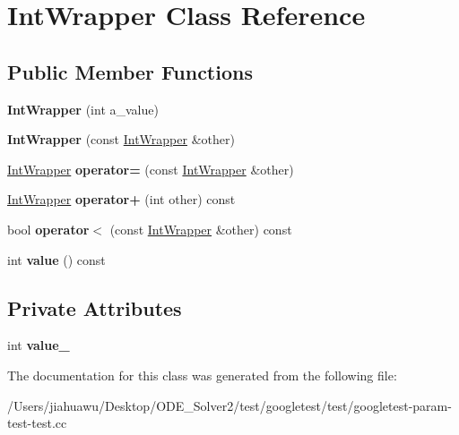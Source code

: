 \hypertarget{class_int_wrapper}{}\section{Int\+Wrapper Class Reference}
\label{class_int_wrapper}
\subsection*{Public Member Functions}
\begin{DoxyCompactItemize}
\item 
\mbox{\label{class_int_wrapper_a1d35e0d0b9c0fc109a8d2a2118ae6010}} 
{\bfseries Int\+Wrapper} (int a\+\_\+value)
\item 
\mbox{\label{class_int_wrapper_af23efe3c8d8bf176948922b41e8f253e}} 
{\bfseries Int\+Wrapper} (const \mbox{\hyperlink{class_int_wrapper}{Int\+Wrapper}} \&other)
\item 
\mbox{\label{class_int_wrapper_a39077b3c0eb1dd8a296a81bfb0a047b3}} 
\mbox{\hyperlink{class_int_wrapper}{Int\+Wrapper}} {\bfseries operator=} (const \mbox{\hyperlink{class_int_wrapper}{Int\+Wrapper}} \&other)
\item 
\mbox{\label{class_int_wrapper_abf97bd11dd2825f3cb9e4d9f48152b56}} 
\mbox{\hyperlink{class_int_wrapper}{Int\+Wrapper}} {\bfseries operator+} (int other) const
\item 
\mbox{\label{class_int_wrapper_a940fd2978cdf7849281f11b32df94163}} 
bool {\bfseries operator$<$} (const \mbox{\hyperlink{class_int_wrapper}{Int\+Wrapper}} \&other) const
\item 
\mbox{\label{class_int_wrapper_a6103e9dc5eb94678985e3c2ac481b508}} 
int {\bfseries value} () const
\end{DoxyCompactItemize}
\subsection*{Private Attributes}
\begin{DoxyCompactItemize}
\item 
\mbox{\label{class_int_wrapper_a9695c22c2bcd5a7bc2775cf6e3a6e33a}} 
int {\bfseries value\+\_\+}
\end{DoxyCompactItemize}


The documentation for this class was generated from the following file\+:\begin{DoxyCompactItemize}
\item 
/\+Users/jiahuawu/\+Desktop/\+O\+D\+E\+\_\+\+Solver2/test/googletest/test/googletest-\/param-\/test-\/test.\+cc\end{DoxyCompactItemize}
